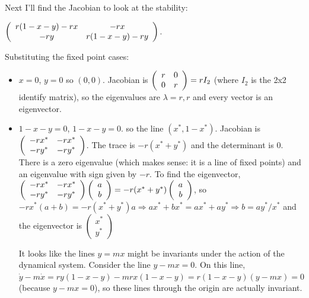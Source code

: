 \documentclass[12pt,letterpaper]{exam}
\begin{document}
\begin{questions}
\begin{parts}
\begin{solution}
Next I'll find the Jacobian to look at the stability: 

$\left(\begin{array}{c c }r(1-x-y) - rx & -rx \\ -ry & r(1-x-y) - ry \end{array}\right)$.

Substituting the fixed point cases:
\begin{itemize}
\item $x = 0$, $y = 0$ so $(0,0)$.  Jacobian is $\left(\begin{array}{c c }r & 0 \\ 0 & r \end{array}\right) = r I_2$ (where $I_2$ is the 2x2 identify matrix), so the eigenvalues are $\lambda = r, r$ and every vector is an eigenvector.
\item $1 -x -y = 0$, $1-x-y = 0$. so the line $(x^*, 1-x^*)$.  Jacobian is $\left(\begin{array}{c c }- rx^* & -rx^* \\ -ry^* & - ry^* \end{array}\right)$.  The trace is $-r (x^*+y^*)$ and the determinant is $0$.  There is a zero eigenvalue (which makes sense: it is a line of fixed points) and an eigenvalue with sign given by $-r$. To find the eigenvector, $\left(\begin{array}{c c }- rx^* & -rx^* \\ -ry^* & - ry^* \end{array}\right)\left(\begin{array}{c} a \\ b\end{array}\right) = -r(x^*+y^*)\left(\begin{array}{c} a \\ b\end{array}\right)$, so $-rx^*(a+b) = -r(x^*+y^*) a \Rightarrow ax^* + bx^* = ax^* + ay^* \Rightarrow b = ay^*/x^*$ and the eigenvector is $\left(\begin{array}{c} x^* \\ y^*\end{array}\right)$  

It looks like the lines $y = mx$ might be invariants under the action of the dynamical system.  Consider the line $y - m x = 0$.  On this line, $\dot{y} - m\dot{x} = r y(1-x-y) - m r x(1-x-y) = r(1-x-y)(y-mx) = 0$ (because $y-mx = 0$), so these lines through the origin are actually invariant.



\end{itemize}
\end{solution}
\end{parts}
\end{questions}
\end{document}
